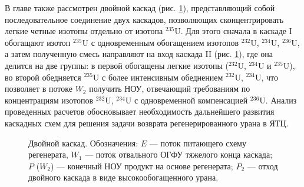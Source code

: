В главе также рассмотрен двойной каскад (рис. \ref{fig:double_ru_in3}), представляющий собой последовательное соединение двух каскадов, позволяющих сконцентрировать легкие четные изотопы отдельно от изотопа $^{235}$U. Для этого сначала в каскаде I обогащают изотоп $^{235}$U с одновременным обогащением изотопов $^{232}$U, $^{234}$U, $^{236}$U, а затем полученную смесь направляют на вход каскада II (рис. \ref{fig:double_ru_in3}), где она делится на две группы: в первой обогащены легкие изотопы ($^{232}$U, $^{234}$U и $^{235}$U), во второй обедняется $^{235}$U с более интенсивным обеднением $^{232}$U, $^{234}$U, что позволяет в потоке $W_2$ получить НОУ, отвечающий требованиям по концентрациям изотопов $^{232}$U, $^{234}$U с одновременной компенсацией $^{236}$U. Анализ проведенных расчетов обосновывает необходимость дальнейшего развития каскадных схем для решения задачи возврата регенерированного урана в ЯТЦ.

\begin{figure}[ht]
  \caption{Двойной каскад. Обозначения: $E$ --- поток питающего схему регенерата, $W_1$ --- поток отвального ОГФУ тяжелого конца каскада; $P$ ($W_2$) --- конечный НОУ продукт на основе регенерата; $P_2$ --- отход двойного каскада в виде высокообогащенного урана.}\label{fig:double_ru_in3}
\end{figure}


